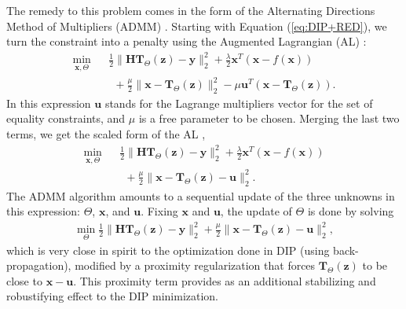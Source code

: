 \documentclass[12pt]{article}
\def\x{{\mathbf x}}
\def\H{{\mathbf H}}
\def\u{ \mathbf{u}}
\def\y{{\mathbf y}}
\def\z{{\mathbf z}}
\def\u{{\mathbf u}}
\def\T{{\mathbf T}}
\begin{document}
The remedy to this problem comes in the form of the Alternating Directions Method of Multipliers (ADMM) \cite{ADMM}. Starting with Equation (\ref{eq:DIP+RED}), we turn the constraint into a penalty using the Augmented Lagrangian (AL) \cite{AL}: 
\begin{eqnarray}\label{eq:DIP+RED:A}
\min_{\x, \Theta} && \frac{1}{2} \|\H\T_{\Theta}(\z)-\y\|^2_2 + \frac{\lambda}{2}\x^T\left(\x-f(\x)\right) \\ \nonumber &&~~ + \frac{\mu}{2}\|\x - \T_{\Theta}(\z)\|_2^2 - \mu \u^T \left(\x - \T_{\Theta}(\z) \right).
\end{eqnarray}
In this expression $\u$ stands for the Lagrange multipliers vector for the set of equality constraints, and $\mu$ is a free parameter to be chosen. Merging the last two terms, we get the scaled form of the AL \cite{AL}, 
\begin{eqnarray}\label{eq:DIP+RED:B}
\min_{\x, \Theta} && \frac{1}{2} \|\H\T_{\Theta}(\z)-\y\|^2_2 + \frac{\lambda}{2}\x^T\left(\x-f(\x)\right) \\ \nonumber && ~~+ \frac{\mu}{2}\|\x - \T_{\Theta}(\z) - \u\|_2^2.
\end{eqnarray}
The ADMM algorithm amounts to a sequential update of the three unknowns in this expression:  $\Theta$, $\x$, and $\u$. Fixing $\x$ and $\u$, the update of $\Theta$ is done by solving 
\begin{eqnarray}\label{eq:UpdateTheta}
\min_{\Theta} \frac{1}{2} \|\H\T_{\Theta}(\z)-\y\|^2_2 + \frac{\mu}{2}\|\x - \T_{\Theta}(\z) - \u\|_2^2, 
\end{eqnarray}
which is very close in spirit to the optimization done in DIP (using back-propagation), modified by a proximity regularization that forces $\T_{\Theta}(\z)$ to be close to $\x -\u$. This proximity term provides as an additional stabilizing and robustifying effect to the DIP minimization. 
\end{document}
